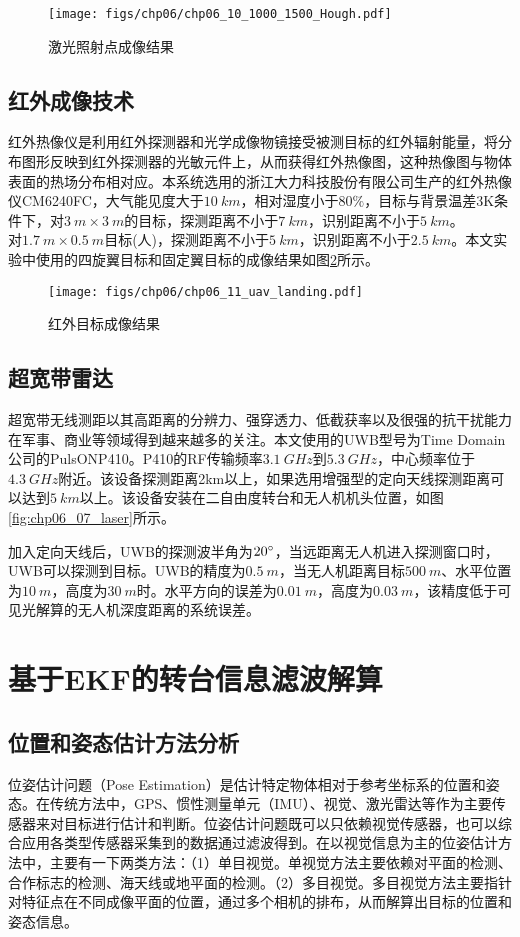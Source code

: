 \begin{figure}[!t]
	\centering
	\texttt{[image: figs/chp06/chp06\_10\_1000\_1500\_Hough.pdf]}	
	\caption{激光照射点成像结果}
	\label{fig:chp06_10_1000_1500_Hough}
\end{figure}


\subsection{红外成像技术}
红外热像仪是利用红外探测器和光学成像物镜接受被测目标的红外辐射能量，将分布图形反映到红外探测器的光敏元件上，从而获得红外热像图，这种热像图与物体表面的热场分布相对应。本系统选用的浙江大力科技股份有限公司生产的红外热像仪CM6240FC，大气能见度大于$10\ km$，相对湿度小于$80\%$，目标与背景温差3K条件下，对$3\ m\times3\ m$的目标，探测距离不小于$7\ km$，识别距离不小于$5\ km$。$对1.7\ m\times0.5\ m$目标(人)，探测距离不小于$5\ km$，识别距离不小于$2.5\ km$。本文实验中使用的四旋翼目标和固定翼目标的成像结果如图\ref{fig:chp06_11_uav_landing}所示。

\begin{figure}[!t]
	\centering
	\texttt{[image: figs/chp06/chp06\_11\_uav\_landing.pdf]}	
	\caption{红外目标成像结果}
	\label{fig:chp06_11_uav_landing}
\end{figure}

\subsection{超宽带雷达}
超宽带无线测距以其高距离的分辨力、强穿透力、低截获率以及很强的抗干扰能力在军事、商业等领域得到越来越多的关注。本文使用的UWB型号为Time Domain公司的PulsONP410。P410的RF传输频率$3.1\ GHz$到$5.3\ GHz$，中心频率位于$4.3\ GHz$附近。该设备探测距离2km以上，如果选用增强型的定向天线探测距离可以达到$5\ km$以上。该设备安装在二自由度转台和无人机机头位置，如图\ref{fig:chp06_07_laser}所示。

加入定向天线后，UWB的探测波半角为$20\degree$，当远距离无人机进入探测窗口时，UWB可以探测到目标。UWB的精度为$0.5\ m$，当无人机距离目标$500\ m$、水平位置为$10\ m$，高度为$30\ m$时。水平方向的误差为$0.01\ m$，高度为$0.03\ m$，该精度低于可见光解算的无人机深度距离的系统误差。

\section{基于EKF的转台信息滤波解算}
\subsection{位置和姿态估计方法分析}
位姿估计问题（Pose Estimation）是估计特定物体相对于参考坐标系的位置和姿态。在传统方法中，GPS、惯性测量单元（IMU）、视觉、激光雷达等作为主要传感器来对目标进行估计和判断。位姿估计问题既可以只依赖视觉传感器，也可以综合应用各类型传感器采集到的数据通过滤波得到。在以视觉信息为主的位姿估计方法中，主要有一下两类方法：（1）单目视觉。单视觉方法主要依赖对平面的检测、合作标志的检测、海天线或地平面的检测。（2）多目视觉。多目视觉方法主要指针对特征点在不同成像平面的位置，通过多个相机的排布，从而解算出目标的位置和姿态信息。

